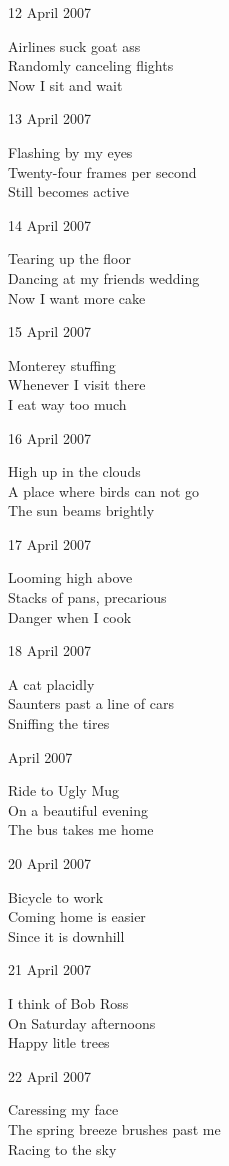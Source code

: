 \documentclass[12pt]{article}
\begin{document}
\newpage

12 April 2007

Airlines suck goat ass \\
Randomly canceling flights \\
Now I sit and wait

13 April 2007

Flashing by my eyes \\
Twenty-four frames per second \\
Still becomes active

14 April 2007

Tearing up the floor \\
Dancing at my friends wedding \\
Now I want more cake

15 April 2007

Monterey stuffing \\
Whenever I visit there \\
I eat way too much

16 April 2007

High up in the clouds \\
A place where birds can not go \\
The sun beams brightly

17 April 2007

Looming high above \\
Stacks of pans, precarious \\
Danger when I cook

18 April 2007 

A cat placidly \\
Saunters past a line of cars \\
Sniffing the tires

 April 2007

Ride to Ugly Mug \\
On a beautiful evening \\
The bus takes me home

20 April 2007

Bicycle to work \\
Coming home is easier \\
Since it is downhill

21 April 2007

I think of Bob Ross \\
On Saturday afternoons \\
Happy litle trees

22 April 2007

Caressing my face \\
The spring breeze brushes past me \\
Racing to the sky 
\end{document}
